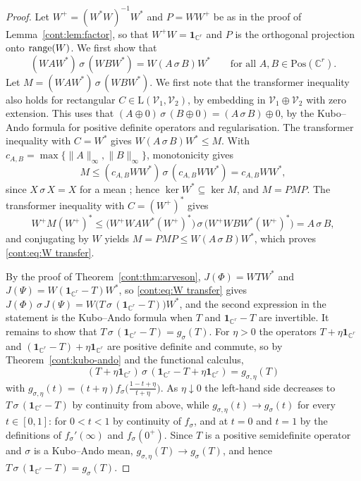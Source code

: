 \begin{proof}
Let $W^+=(W^*W)^{-1}W^*$ and $P=WW^+$ be as in the proof of Lemma~\ref{cont:lem:factor}, so that $W^+W=\mathbf{1}_{\mathbb{C}^r}$ and $P$ is the orthogonal projection onto $\operatorname{range}(W)$. We first show that
\begin{equation}\label{cont:eq:W transfer}
(WAW^*)\,\sigma\,(WBW^*)=W(A\,\sigma\,B)W^*\qquad\text{for all }A,B\in\mathrm{Pos}(\mathbb{C}^r).
\end{equation}
Let $M=(WAW^*)\,\sigma\,(WBW^*)$. We first note that the transformer inequality also holds for rectangular $C\in\mathrm{L}(\mathcal{V}_1,\mathcal{V}_2)$, by embedding in $\mathcal{V}_1\oplus\mathcal{V}_2$ with zero extension. This uses that $(A\oplus0)\,\sigma\,(B\oplus0)=(A\,\sigma\,B)\oplus0$, by the Kubo--Ando formula for positive definite operators and regularisation. The transformer inequality with $C=W^*$ gives $W(A\,\sigma\,B)W^*\leq M$. With $c_{A,B}=\max\{\|A\|_\infty,\|B\|_\infty\}$, monotonicity gives
\[
M\leq(c_{A,B}WW^*)\,\sigma\,(c_{A,B}WW^*)=c_{A,B}WW^*,
\]
since $X\,\sigma\,X=X$ for a mean \cite{KuboAndo1980}; hence $\ker W^*\subseteq\ker M$, and $M=PMP$. The transformer inequality with $C=(W^+)^*$ gives
\[
W^+M(W^+)^*\leq\big(W^+WAW^*(W^+)^*\big)\,\sigma\,\big(W^+WBW^*(W^+)^*\big)=A\,\sigma\,B,
\]
and conjugating by $W$ yields $M=PMP\leq W(A\,\sigma\,B)W^*$, which proves \eqref{cont:eq:W transfer}.

By the proof of Theorem~\ref{cont:thm:arveson}, $J(\Phi)=WTW^*$ and $J(\Psi)=W(\mathbf{1}_{\mathbb{C}^r}-T)W^*$, so \eqref{cont:eq:W transfer} gives $J(\Phi)\,\sigma\,J(\Psi)=W\big(T\,\sigma\,(\mathbf{1}_{\mathbb{C}^r}-T)\big)W^*$, and the second expression in the statement is the Kubo--Ando formula when $T$ and $\mathbf{1}_{\mathbb{C}^r}-T$ are invertible. It remains to show that $T\,\sigma\,(\mathbf{1}_{\mathbb{C}^r}-T)=g_\sigma(T)$. For $\eta>0$ the operators $T+\eta\mathbf{1}_{\mathbb{C}^r}$ and $(\mathbf{1}_{\mathbb{C}^r}-T)+\eta\mathbf{1}_{\mathbb{C}^r}$ are positive definite and commute, so by Theorem~\ref{cont:kubo-ando} and the functional calculus,
\[
(T+\eta\mathbf{1}_{\mathbb{C}^r})\,\sigma\,(\mathbf{1}_{\mathbb{C}^r}-T+\eta\mathbf{1}_{\mathbb{C}^r})=g_{\sigma,\eta}(T)
\]
with $g_{\sigma,\eta}(t)=(t+\eta)f_\sigma\big(\tfrac{1-t+\eta}{t+\eta}\big)$. As $\eta\downarrow0$ the left-hand side decreases to $T\,\sigma\,(\mathbf{1}_{\mathbb{C}^r}-T)$ by continuity from above, while $g_{\sigma,\eta}(t)\to g_\sigma(t)$ for every $t\in[0,1]$: for $0<t<1$ by continuity of $f_\sigma$, and at $t=0$ and $t=1$ by the definitions of $f_\sigma'(\infty)$ and $f_\sigma(0^+)$. Since $T$ is a positive semidefinite operator and $\sigma$ is a Kubo--Ando mean, $g_{\sigma,\eta}(T)\to g_\sigma(T)$, and hence $T\,\sigma\,(\mathbf{1}_{\mathbb{C}^r}-T)=g_\sigma(T)$.


\end{proof}
